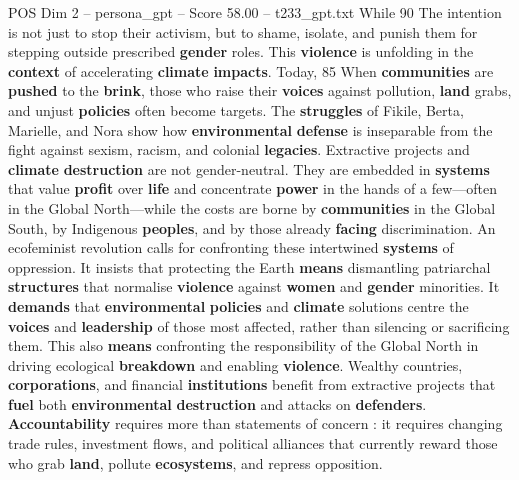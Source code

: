 \begin{textsample}{POS Dim 2 – persona\_gpt – Score 58.00 – t233\_gpt.txt}
While 90 %
The intention is not just to stop their activism, but to shame, isolate, and punish them for stepping outside prescribed \textbf{gender} roles.
This \textbf{violence} is unfolding in the \textbf{context} of accelerating \textbf{climate} \textbf{impacts}.
Today, 85 %
When \textbf{communities} are \textbf{pushed} to the \textbf{brink}, those who raise their \textbf{voices} against pollution, \textbf{land} grabs, and unjust \textbf{policies} often become targets.
The \textbf{struggles} of Fikile, Berta, Marielle, and Nora show how \textbf{environmental} \textbf{defense} is inseparable from the fight against sexism, racism, and colonial \textbf{legacies}.
Extractive projects and \textbf{climate} \textbf{destruction} are not gender-neutral.
They are embedded in \textbf{systems} that value \textbf{profit} over \textbf{life} and concentrate \textbf{power} in the hands of a few—often in the Global North—while the costs are borne by \textbf{communities} in the Global South, by Indigenous \textbf{peoples}, and by those already \textbf{facing} discrimination.
An ecofeminist revolution calls for confronting these intertwined \textbf{systems} of oppression.
It insists that protecting the Earth \textbf{means} dismantling patriarchal \textbf{structures} that normalise \textbf{violence} against \textbf{women} and \textbf{gender} minorities.
It \textbf{demands} that \textbf{environmental} \textbf{policies} and \textbf{climate} solutions centre the \textbf{voices} and \textbf{leadership} of those most affected, rather than silencing or sacrificing them.
This also \textbf{means} confronting the responsibility of the Global North in driving ecological \textbf{breakdown} and enabling \textbf{violence}.
Wealthy countries, \textbf{corporations}, and financial \textbf{institutions} benefit from extractive projects that \textbf{fuel} both \textbf{environmental} \textbf{destruction} and attacks on \textbf{defenders}. \textbf{Accountability} requires more than statements of concern : it requires changing trade rules, investment flows, and political alliances that currently reward those who grab \textbf{land}, pollute \textbf{ecosystems}, and repress opposition.

\end{textsample}
